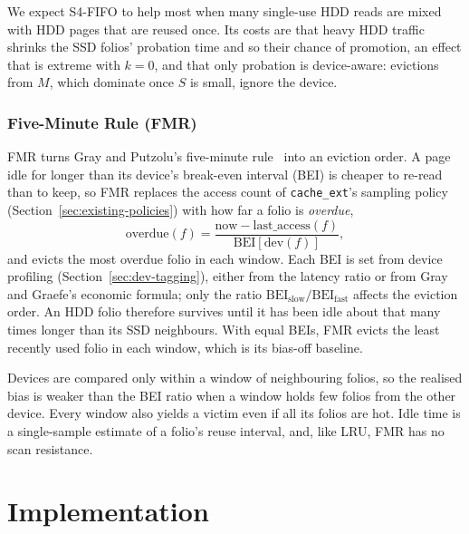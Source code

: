 \documentclass[11pt,sigconf,nonacm]{acmart}
\newcommand{\cacheExt}{\texttt{cache\_ext}}
\begin{document}
We expect S4-FIFO to help most when many single-use HDD reads are mixed with HDD pages that are reused once. Its costs are that heavy HDD traffic shrinks the SSD folios' probation time and so their chance of promotion, an effect that is extreme with $k=0$, and that only probation is device-aware: evictions from $M$, which dominate once $S$ is small, ignore the device.

\subsubsection{Five-Minute Rule (FMR)}
\label{sec:fmr}

FMR turns Gray and Putzolu's five-minute rule~\cite{gray1987fiveminute, gray1997fiveminute} into an eviction order. A page idle for longer than its device's break-even interval (BEI) is cheaper to re-read than to keep, so FMR replaces the access count of \cacheExt{}'s sampling policy (Section~\ref{sec:existing-policies}) with how far a folio is \emph{overdue},
\[
\text{overdue}(f) = \frac{\text{now} - \text{last\_access}(f)}{\text{BEI}[\text{dev}(f)]},
\]
and evicts the most overdue folio in each window. Each BEI is set from device profiling (Section~\ref{sec:dev-tagging}), either from the latency ratio or from Gray and Graefe's economic formula; only the ratio $\text{BEI}_\text{slow}/\text{BEI}_\text{fast}$ affects the eviction order. An HDD folio therefore survives until it has been idle about that many times longer than its SSD neighbours. With equal BEIs, FMR evicts the least recently used folio in each window, which is its bias-off baseline.

Devices are compared only within a window of neighbouring folios, so the realised bias is weaker than the BEI ratio when a window holds few folios from the other device. Every window also yields a victim even if all its folios are hot. Idle time is a single-sample estimate of a folio's reuse interval, and, like LRU, FMR has no scan resistance.

\section{Implementation}

\end{document}
